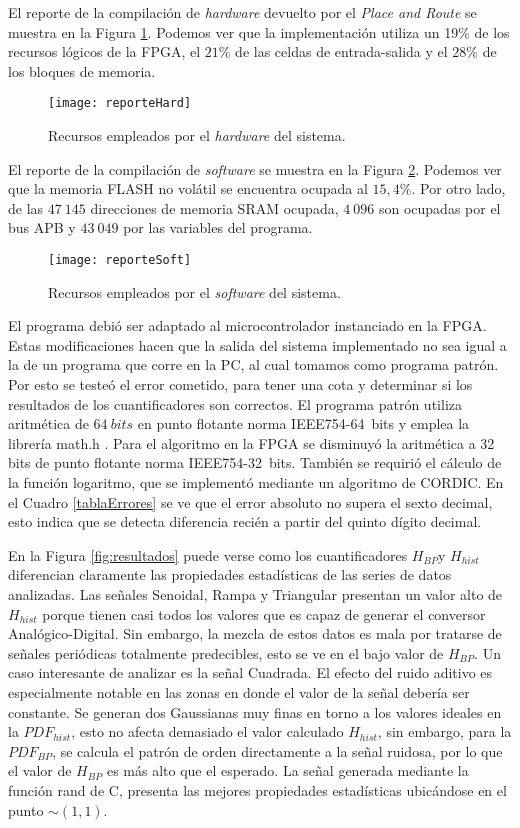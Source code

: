 El reporte de la compilación de \textit{hardware} devuelto por el \textit{Place and Route} se muestra en la Figura \ref{fig:hard}. Podemos ver que la implementación utiliza un 19\% de los recursos lógicos de la FPGA, el $21\%$ de las celdas de entrada-salida y el $28\%$ de los bloques de memoria.
%
\begin{figure}[htb]
	\centering\texttt{[image: reporteHard]}
	\caption{Recursos empleados por el \textit{hardware} del sistema.}\label{fig:hard}
\end{figure}

El reporte de la compilación de \textit{software} se muestra en la Figura \ref{fig:soft}.
Podemos ver que la memoria FLASH no volátil se encuentra ocupada al $15,4\%$.
Por otro lado, de las $47~145$ direcciones de memoria SRAM ocupada, $4~096$ son ocupadas por el bus APB y $43~049$ por las variables del programa.
%
\begin{figure}[htb]
	\centering\texttt{[image: reporteSoft]}
	\caption{Recursos empleados por el \textit{software} del sistema.}\label{fig:soft}
\end{figure}

El programa debió ser adaptado al microcontrolador instanciado en la FPGA.
Estas modificaciones hacen que la salida del sistema implementado no sea igual a la de un programa que corre en la PC, al cual tomamos como programa patrón.
Por esto se testeó el error cometido, para tener una cota y determinar si los resultados de los cuantificadores son correctos.
El programa patrón utiliza aritmética de $64~bits$ en punto flotante norma IEEE754-64~bits y emplea la librería math.h \cite{Mathe}.
Para el algoritmo en la FPGA se disminuyó la aritmética a 32 bits de punto flotante norma IEEE754-32~bits.
También se requirió el cálculo de la función logaritmo, que se implementó mediante un algoritmo de CORDIC.
En el Cuadro \ref{tablaErrores} se ve que el error absoluto no supera el sexto decimal, esto indica que se detecta diferencia recién a partir del quinto dígito decimal.

En la Figura \ref{fig:resultados} puede verse como los cuantificadores $H_{BP}$y $H_{hist}$ diferencian claramente las propiedades estadísticas de las series de datos analizadas.
Las señales Senoidal, Rampa y Triangular presentan un valor alto de $H_{hist}$ porque tienen casi todos los valores que es capaz de generar el conversor Analógico-Digital.
Sin embargo, la mezcla de estos datos es mala por tratarse de señales periódicas totalmente predecibles, esto se ve en el bajo valor de $H_{BP}$.
Un caso interesante de analizar es la señal Cuadrada.
El efecto del ruido aditivo es especialmente notable en las zonas en donde el valor de la señal debería ser constante.
Se generan dos Gaussianas muy finas en torno a los valores ideales en la $PDF_{hist}$, esto no afecta demasiado el valor calculado $H_{hist}$, sin embargo, para la $PDF_{BP}$, se calcula el patrón de orden directamente a la señal ruidosa, por lo que el valor de $H_{BP}$ es más alto que el esperado.
La señal generada mediante la función rand de C, presenta las mejores propiedades estadísticas ubicándose en el punto $\sim(1,1)$.